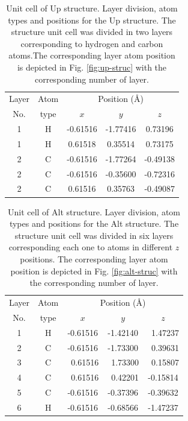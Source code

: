\documentclass[prb,11pt,tightenlines,twocolumn,aps]{revtex4-1}
\begin{document}
\begin{table}[t]
\center
\begin{tabular}{ccccc}\\
\hline
\quad Layer \quad & \quad Atom \qquad & \multicolumn{3}{c}{Position (\AA)} \\
\cline{3-5}
\quad No.   \quad & \quad type \qquad & $x$ & $y$ & $z$  \\
\hline
1 & H & -0.61516 & -1.77416 &  0.73196 \\
1 & H &  0.61518 &  0.35514 &  0.73175 \\
2 & C & -0.61516 & -1.77264 & -0.49138 \\
2 & C & -0.61516 & -0.35600 & -0.72316 \\
2 & C &  0.61516 &  0.35763 & -0.49087 \\
\hline
\end{tabular}

\caption{Unit cell of Up structure. Layer division, atom types and
positions for the Up structure. The structure unit cell was divided in
two layers corresponding to hydrogen and carbon atoms.The corresponding layer
atom position is depicted in Fig. \ref{fig:up-struc} with the corresponding
number of layer.}
\label{tab:up-unitcell}
\end{table}
% 
% 
\begin{table}[t]
\center
\begin{tabular}{ccccc}\\
\hline
\quad Layer \quad & \quad Atom \qquad & \multicolumn{3}{c}{Position (\AA)} \\
\cline{3-5}
\quad No.   \quad & \quad type \qquad & $x$ & $y$ & $z$  \\
\hline
1 & H &  -0.61516 &  -1.42140 & \ 1.47237 \\
2 & C &  -0.61516 &  -1.73300 & \ 0.39631 \\
3 & C & \ 0.61516 & \ 1.73300 & \ 0.15807 \\
4 & C & \ 0.61516 & \ 0.42201 &  -0.15814 \\
5 & C &  -0.61516 &  -0.37396 &  -0.39632 \\
6 & H &  -0.61516 &  -0.68566 &  -1.47237 \\
\hline
\end{tabular}

\caption{Unit cell of Alt structure. Layer division, atom types and
positions for the Alt structure. The structure unit cell was divided in
six layers corresponding each one to atoms in different $z$ positions. The
corresponding layer atom position is depicted in Fig. \ref{fig:alt-struc} with
the corresponding number of layer.}
\label{tab:alt-unitcell}
\end{table}
\end{document}
